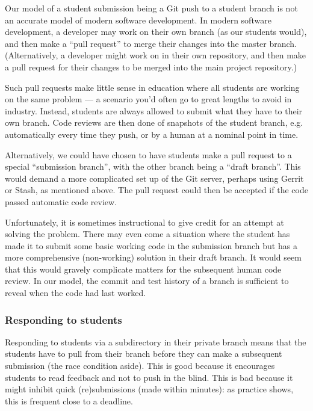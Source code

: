 Our model of a student submission being a Git push to a student branch is not
an accurate model of modern software development. In modern software
development, a developer may work on their own branch (as our students would),
and then make a ``pull request'' to merge their changes into the master branch.
(Alternatively, a developer might work on in their own repository, and then
make a pull request for their changes to be merged into the main project
repository\cite{bird-et-al-2009}.)

Such pull requests make little sense in education where all students are
working on the same problem --- a scenario you'd often go to great lengths to
avoid in industry. Instead, students are always allowed to submit what they
have to their own branch. Code reviews are then done of snapshots of the
student branch, e.g. automatically every time they push, or by a human at a
nominal point in time.

Alternatively, we could have chosen to have students make a pull request to a
special ``submission branch'', with the other branch being a ``draft branch''.
This would demand a more complicated set up of the Git server, perhaps using
Gerrit or Stash, as mentioned above. The pull request could then be accepted
if the code passed automatic code review.

Unfortunately, it is sometimes instructional to give credit for an attempt at
solving the problem. There may even come a situation where the student has made
it to submit some basic working code in the submission branch but has a more
comprehensive (non-working) solution in their draft branch. It would seem that
this would gravely complicate matters for the subsequent human code review. In
our model, the commit and test history of a branch is sufficient to reveal when
the code had last worked.

\subsubsection{Responding to students}

Responding to students via a subdirectory in their private branch means that
the students have to pull from their branch before they can make a subsequent
submission (the race condition aside). This is good because it encourages
students to read feedback and not to push in the blind. This is bad because it
might inhibit quick (re)submissions (made within minutes): as practice shows,
this is frequent close to a deadline.

